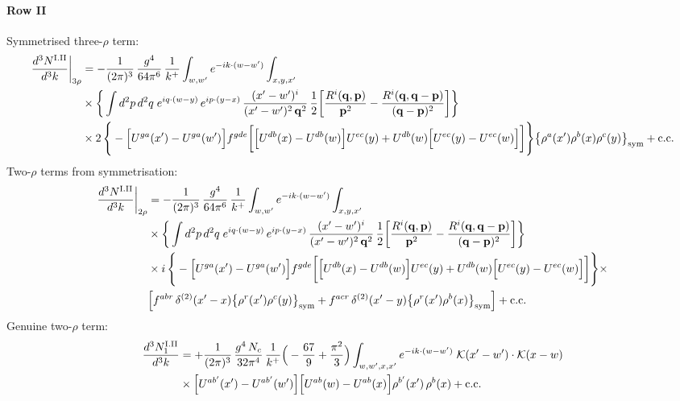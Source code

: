 \documentclass[9pt]{article}
\numberwithin{equation}{section}
\begin{document}
\paragraph*{Row II}
Symmetrised three-$\rho$ term:
\begin{align}
\frac{d^{3}N^{\rm I.II}}{d^{3}k}\bigg|_{3\rho}&=-\frac{1}{(2\pi)^{3}}\,\frac{g^{4}}{64\pi^{6}}\,\frac{1}{k^{+}}\int_{w,w'}e^{-ik\cdot(w-w')}\int_{x,y,x'}\notag\\
&\times\bigg\{\int d^{2}p\,d^{2}q\;e^{iq\cdot(w-y)}\,e^{ip\cdot(y-x)}\,\frac{(x'-w')^{i}}{(x'-w')^{2}\,\mathbf{q}^{2}}\,\frac{1}{2}\bigg[\frac{R^{i}(\mathbf{q},\mathbf{p})}{\mathbf{p}^{2}}-\frac{R^{i}(\mathbf{q},\mathbf{q}-\mathbf{p})}{(\mathbf{q}-\mathbf{p})^{2}}\bigg]\bigg\}\notag\\
&\times 2\,\Bigg\{-\Big[U^{ga}(x')-U^{ga}(w')\Big]f^{gde}\bigg[\Big[U^{db}(x)-U^{db}(w)\Big]U^{ec}(y)+U^{db}(w)\Big[U^{ec}(y)-U^{ec}(w)\Big]\bigg]\Bigg\}\big\{\rho^{a}(x')\rho^{b}(x)\rho^{c}(y)\big\}_{\rm sym}+{\rm c.c.}\label{eq:H-I.II-3}
\end{align}
Two-$\rho$ terms from symmetrisation:
\begin{align}
\frac{d^{3}N^{\rm I.II}}{d^{3}k}\bigg|_{2\rho}&=-\frac{1}{(2\pi)^{3}}\,\frac{g^{4}}{64\pi^{6}}\,\frac{1}{k^{+}}\int_{w,w'}e^{-ik\cdot(w-w')}\int_{x,y,x'}\notag\\
&\times\bigg\{\int d^{2}p\,d^{2}q\;e^{iq\cdot(w-y)}\,e^{ip\cdot(y-x)}\,\frac{(x'-w')^{i}}{(x'-w')^{2}\,\mathbf{q}^{2}}\,\frac{1}{2}\bigg[\frac{R^{i}(\mathbf{q},\mathbf{p})}{\mathbf{p}^{2}}-\frac{R^{i}(\mathbf{q},\mathbf{q}-\mathbf{p})}{(\mathbf{q}-\mathbf{p})^{2}}\bigg]\bigg\}\notag\\
&\times i\,\Bigg\{-\Big[U^{ga}(x')-U^{ga}(w')\Big]f^{gde}\bigg[\Big[U^{db}(x)-U^{db}(w)\Big]U^{ec}(y)+U^{db}(w)\Big[U^{ec}(y)-U^{ec}(w)\Big]\bigg]\Bigg\}\times\notag \\ & \Big[f^{abr}\,\delta^{(2)}(x'-x)\big\{\rho^{r}(x')\rho^{c}(y)\big\}_{\rm sym}+f^{acr}\,\delta^{(2)}(x'-y)\big\{\rho^{r}(x')\rho^{b}(x)\big\}_{\rm sym}\Big]+{\rm c.c.}\label{eq:H-I.II-2}
\end{align}
Genuine two-$\rho$ term:
\begin{align}
\frac{d^{3}N^{\rm I.II}_{1}}{d^{3}k} & = +\frac{1}{(2\pi)^{3}}\,\frac{g^{4}\,N_{c}}{32\pi^{4}}\,\frac{1}{k^{+}}\Big(-\frac{67}{9}+\frac{\pi^{2}}{3}\Big)\int_{w,w',x,x'} e^{-ik\cdot(w-w')}\;\mathcal{K}(x'-w')\cdot\mathcal{K}(x-w)\notag \\
& \times\Big[U^{ab'}(x')-U^{ab'}(w')\Big]\Big[U^{ab}(w)-U^{ab}(x)\Big]\rho^{b'}(x')\,\rho^{b}(x) + {\rm c.c.}\label{eq:H-I.II-2o}
\end{align}
\end{document}
